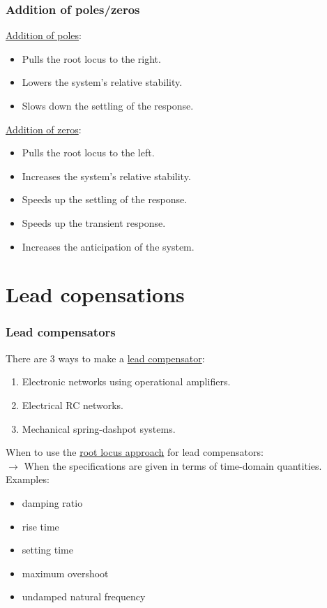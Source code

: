 \begin{frame}
	\frametitle{Addition of poles/zeros}
	\underline{Addition of poles}:\\
	\begin{itemize}
		\item Pulls the root locus to the right.
		\item Lowers the system's relative stability.
		\item Slows down the settling of the response.
	\end{itemize}
	\vspace{3mm}
	
	\underline{Addition of zeros}:
	\begin{itemize}
		\item Pulls the root locus to the left.
		\item Increases the system's relative stability.
		\item Speeds up the settling of the response.
		\item Speeds up the transient response.
		\item Increases the anticipation of the system. 
	\end{itemize}
\end{frame}

\section{Lead copensations}

\begin{frame}
	\frametitle{Lead compensators}
		There are 3 ways to make a \underline{lead compensator}:
		\begin{enumerate}
			\item Electronic networks using operational amplifiers.
			\item Electrical RC networks.
			\item Mechanical spring-dashpot systems.
		\end{enumerate}
		\vspace{3mm}
		
		When to use the \underline{root locus approach} for lead compensators:\\
		$\rightarrow$ When the specifications are given in terms of time-domain quantities. Examples:
		\begin{itemize}
			\item damping ratio
			\item rise time
			\item setting time
			\item maximum overshoot
			\item undamped natural frequency
		\end{itemize}
\end{frame}

